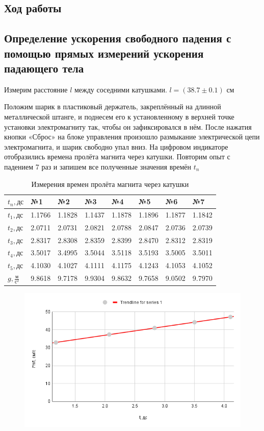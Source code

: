 \documentclass[a4paper, 12pt]{article}
\begin{document}
\begin{center}
    
\section*{Ход работы}
\subsection*{Определение ускорения свободного падения с помощью прямых измерений ускорения падающего тела}
\bigskip
Измерим расстояние $l$ между соседними катушками. $l = (38.7 \pm 0.1)$ см

Положим шарик в пластиковый держатель, закреплённый на длинной металлической штанге, и поднесем его к установленному в верхней точке установки электромагниту так, чтобы он зафиксировался в нём. После нажатия кнопки «Сброс» на блоке управления произошло размыкание электрической цепи электромагнита, и шарик свободно упал вниз. На цифровом индикаторе отобразились времена пролёта магнита через катушки. Повторим опыт с падением 7 раз и запишем все полученные значения времён $t_{n}$

\begin{table}[H]
    \centering
    \begin{tabular}{|l|l|l|l|l|l|l|l|} \hline
        $t_{n}, \text{дс}$ & №1 & №2 & №3 & №4 & №5 & №6 & №7 \\ \hline
        $t_{1}, \text{дс}$ & 1.1766 & 1.1828 & 1.1437 & 1.1878 & 1.1896 & 1.1877 & 1.1842 \\ \hline
        $t_{2}, \text{дс}$ & 2.0711 & 2.0731 & 2.0821 & 2.0788 & 2.0847 & 2.0736 & 2.0739 \\ \hline
        $t_{3}, \text{дс}$ & 2.8317 & 2.8308 & 2.8359 & 2.8399 & 2.8470 & 2.8312 & 2.8319 \\ \hline
        $t_{4}, \text{дс}$ & 3.5017 & 3.4995 & 3.5044 & 3.5118 & 3.5193 & 3.5005 & 3.5011 \\ \hline
        $t_{5}, \text{дс}$ & 4.1030 & 4.1027 & 4.1111 & 4.1175 & 4.1243 & 4.1053 & 4.1052 \\ \hline
        $g, \frac{\text{м}}{\text{с}^2}$ & 9.8618 & 9.7178 & 9.9304 & 9.8632 & 9.7658 & 9.0502 & 9.7970\\ \hline
    \end{tabular}
    \caption{Измерения времен пролёта магнита через катушки}
\end{table}

\begin{figure}[H]
    \centering
    \includegraphics[width=0.5\linewidth]{image_0.png}
\end{figure}


\end{center}
\end{document}
